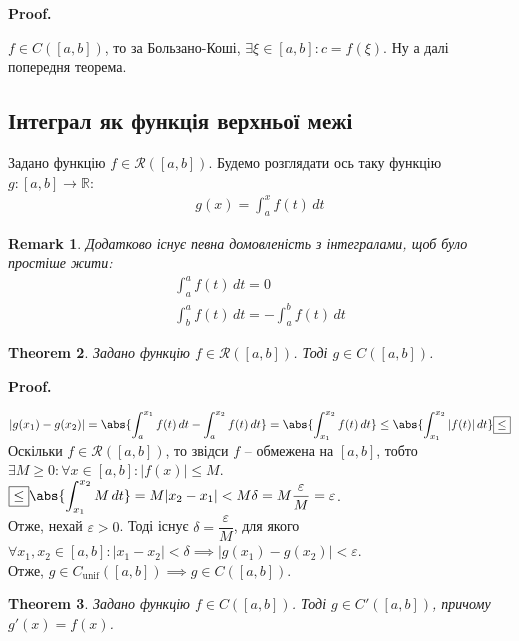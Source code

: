 \documentclass[a4paper, 10pt]{article}
\makeatletter
\def\huge{\displaystyle}
\def\qed{$\blacksquare$}
\theoremstyle{theoremdd}
\newtheorem{theorem}{Theorem}[subsection]
\theoremstyle{theoremdd}
\theoremstyle{theoremdd}
\theoremstyle{theoremdd}
\theoremstyle{theoremdd}
\theoremstyle{theoremdd}
\theoremstyle{theoremdd}
\newtheorem{remark}[theorem]{Remark}
\theoremstyle{theoremdd}
\theoremstyle{theoremdd}
\renewenvironment{proof}[1][Proof.\\]{\par
\pushQED{\hfill \qed}%
\normalfont \topsep6\p@\@plus6\p@\relax
\trivlist
\item\relax
{\bfseries
#1\@addpunct{.}}\hspace\labelsep\ignorespaces
}{%
\popQED\endtrivlist\@endpefalse
}
\makeatother
\begin{document}
\begin{proof}
$f \in C([a,b])$, то за Бользано-Коші, $\exists \xi \in [a,b]: c = f(\xi)$. Ну а далі попередня теорема.
\end{proof}

\subsection{Інтеграл як функція верхньої межі}
Задано функцію $f \in \mathcal{R}([a,b])$. Будемо розглядати ось таку функцію $g \colon [a,b] \to \mathbb{R}$:
\begin{align*}
g(x) = \int_a^x f(t)\,dt
\end{align*}

\begin{remark}
Додатково існує певна домовленість з інтегралами, щоб було простіше жити:
\begin{align*}
\int_a^a f(t)\,dt = 0 \\
\int_b^a f(t)\,dt = -\int_a^b f(t)\,dt
\end{align*}
\end{remark}

\begin{theorem}
Задано функцію $f \in \mathcal{R}([a,b])$. Тоді $g \in C([a,b])$.
\end{theorem}

\begin{proof}
$|g(x_1)-g(x_2)| = \huge \abs{\int_a^{x_1} f(t)\,dt - \int_a^{x_2} f(t)\,dt} = \abs{\int_{x_1}^{x_2} f(t)\,dt} \leq \abs{\int_{x_1}^{x_2} |f(t)|\,dt} \boxed{\leq}$\\
Оскільки $f \in \mathcal{R}([a,b])$, то звідси $f$ -- обмежена на $[a,b]$, тобто $\exists M \geq 0: \forall x \in [a,b]: |f(x)| \leq M$.\\
$\boxed{\leq} \abs{\huge\int_{x_1}^{x_2} M \,dt} = M |x_2-x_1| < M \delta = M \dfrac{\varepsilon}{M} = \varepsilon$.\\
Отже, нехай $\varepsilon > 0$. Тоді існує $\delta = \dfrac{\varepsilon}{M}$, для якого $\forall x_1,x_2 \in [a,b]: |x_1-x_2| < \delta \implies |g(x_1)-g(x_2)| < \varepsilon$.\\
Отже, $g \in C_{\text{unif}}([a,b]) \implies g \in C([a,b])$.
\end{proof}

\begin{theorem}
Задано функцію $f \in C([a,b])$. Тоді $g \in C'([a,b])$, причому $g'(x) = f(x)$.
\end{theorem}
\end{document}
